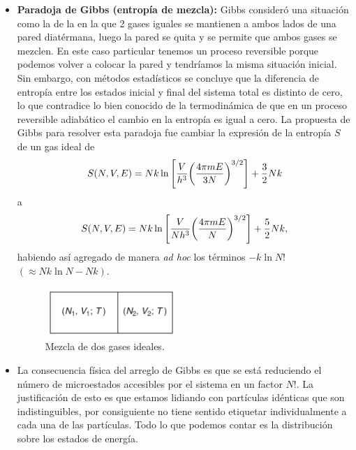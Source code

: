 \begin{itemize}
	\item \textbf{Paradoja de Gibbs (entropía de mezcla):} Gibbs consideró
	una situación como la de la  en la que 2 gases
	iguales se mantienen a ambos lados de una pared diatérmana, luego
	la pared se quita y se permite que ambos gases se mezclen. En este 
	caso particular tenemos un proceso reversible porque podemos 
	volver a colocar la pared y tendríamos la misma situación inicial. 
	Sin embargo, con métodos estadísticos se concluye que la diferencia
	de entropía entre los estados inicial y final del sistema total es distinto
	de cero, lo que contradice lo bien conocido de la termodinámica 
	de que en un proceso reversible adiabático el cambio en la 
	entropía es igual a cero. La propuesta de Gibbs para resolver
	esta paradoja fue cambiar la expresión de la entropía $S$ de 
	un gas ideal de 
	\begin{align}
	S(N,V,E)=Nk\ln\qty[\frac{V}{h^3}\qty(\frac{4\pi mE}{3N})^{3/2}]
	+\frac{3}{2}Nk
	\end{align}
	a
	\begin{align}
	S(N,V,E)=Nk\ln\qty[\frac{V}{Nh^3}\qty(\frac{4\pi mE}{N})^{3/2}]
	+\frac{5}{2}Nk,
	\end{align}
	habiendo así agregado de manera \textit{ad hoc} los términos
	$-k\ln N!$ $(\approx Nk\ln N-Nk)$.
	\begin{figure}
	    \centering
	    \includegraphics[width=5cm]{images/mixing-2gases.png}
	    \caption{Mezcla de dos gases ideales.}
	    \label{fig:gibbs-paradox}
	  \end{figure}
	  
	\item La consecuencia física del arreglo de Gibbs es que se está 
	reduciendo el número de microestados accesibles por el sistema 
	en un factor $N!$. La justificación de esto es que estamos lidiando
  con partículas idénticas que son indistinguibles, por consiguiente
  no tiene sentido etiquetar individualmente a cada una de las
  partículas. Todo lo que podemos contar es la distribución 
  sobre los estados de energía.
\end{itemize}

